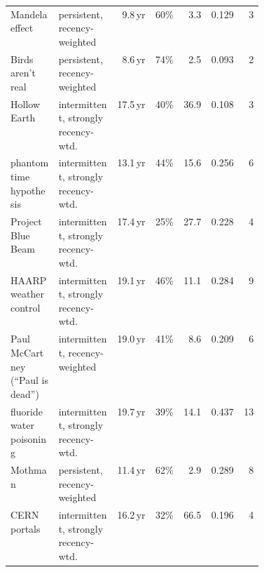 \begin{table}[!htbp]
\begin{tabular}{>{\raggedright\arraybackslash}p{0.19\linewidth}>{\raggedright\arraybackslash}p{0.23\linewidth}rrrrr}
Mandela effect                     & persistent, recency-weighted        & 9.8\,yr & 60\% & 3.3 & 0.129 & 3 \\
Birds aren't real                  & persistent, recency-weighted        & 8.6\,yr & 74\% & 2.5 & 0.093 & 2 \\
Hollow Earth                       & intermittent, strongly recency-wtd. & 17.5\,yr & 40\% & 36.9 & 0.108 & 3 \\
phantom time hypothesis            & intermittent, strongly recency-wtd. & 13.1\,yr & 44\% & 15.6 & 0.256 & 6 \\
Project Blue Beam                  & intermittent, strongly recency-wtd. & 17.4\,yr & 25\% & 27.7 & 0.228 & 4 \\
HAARP weather control              & intermittent, strongly recency-wtd. & 19.1\,yr & 46\% & 11.1 & 0.284 & 9 \\
Paul McCartney (``Paul is dead'')  & intermittent, recency-weighted      & 19.0\,yr & 41\% & 8.6 & 0.209 & 6 \\
fluoride water poisoning           & intermittent, strongly recency-wtd. & 19.7\,yr & 39\% & 14.1 & 0.437 & 13 \\
Mothman                            & persistent, recency-weighted        & 11.4\,yr & 62\% & 2.9 & 0.289 & 8 \\
CERN portals                       & intermittent, strongly recency-wtd. & 16.2\,yr & 32\% & 66.5 & 0.196 & 4 \\
\bottomrule
\end{tabular}
\end{table}
